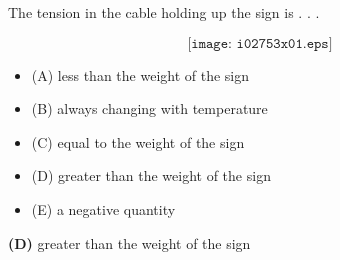 

The tension in the cable holding up the sign is . . .

$$\texttt{[image: i02753x01.eps]}$$

\begin{itemize}
\item{(A)} less than the weight of the sign
\vskip 5pt 
\item{(B)} always changing with temperature
\vskip 5pt 
\item{(C)} equal to the weight of the sign
\vskip 5pt 
\item{(D)} greater than the weight of the sign
\vskip 5pt 
\item{(E)} a negative quantity
\end{itemize}







{\bf (D)} greater than the weight of the sign
 










